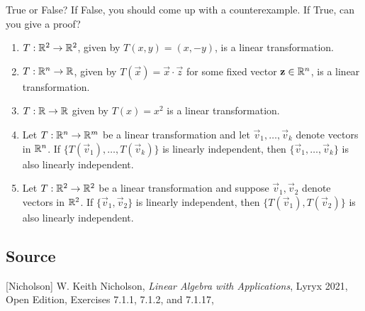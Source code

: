 \documentclass{ximera}
\author{}
\begin{document}
\begin{exercise}

True or False?  If False, you should come up with a counterexample.  If True, can you give a proof?

 \begin{enumerate}
 \item $T : \mathbb{R}^2 \to \mathbb{R}^2$, given by $T(x, y) = (x, -y)$, is a linear transformation.

 \begin{multipleChoice}
 \end{multipleChoice}

 \item $T : \mathbb{R}^n \to \mathbb{R}$, given by $T(\vec{x}) = \vec{x} \cdot \vec{z}$ for some fixed vector $\mathbf{z} \in \mathbb{R}^n$, is a linear transformation.

 \begin{multipleChoice}
 \end{multipleChoice}

\item $T : \mathbb{R} \to \mathbb{R}$ given by $T(x) = x^2$ is a linear transformation.

 \begin{multipleChoice}
 \end{multipleChoice}

 \item Let $T : \mathbb{R}^n \to \mathbb{R}^m$ be a linear transformation and let $\vec{v}_{1}, \dots, \vec{v}_{k}$ denote vectors in $\mathbb{R}^n$.  If $\{T(\vec{v}_{1}), \dots, T(\vec{v}_{k})\}$ is linearly independent, then $\{\vec{v}_{1}, \dots, \vec{v}_{k}\}$ is also linearly independent.

 \begin{multipleChoice}
 \end{multipleChoice}

 \item Let $T : \mathbb{R}^2 \to \mathbb{R}^2$ be a linear transformation and suppose $\vec{v}_{1}, \vec{v}_{2}$ denote vectors in $\mathbb{R}^2$.  If $\{\vec{v}_{1}, \vec{v}_{2}\}$ is linearly independent, then $\{T(\vec{v}_{1}), T(\vec{v}_{2})\}$ is also linearly independent.

 \begin{multipleChoice}
 \end{multipleChoice}
 \end{enumerate}

 
\end{exercise}

\subsection*{Source}
[Nicholson] W. Keith Nicholson, {\it Linear Algebra with Applications}, Lyryx 2021, Open Edition, Exercises 7.1.1, 7.1.2, and 7.1.17, 
\end{document}
